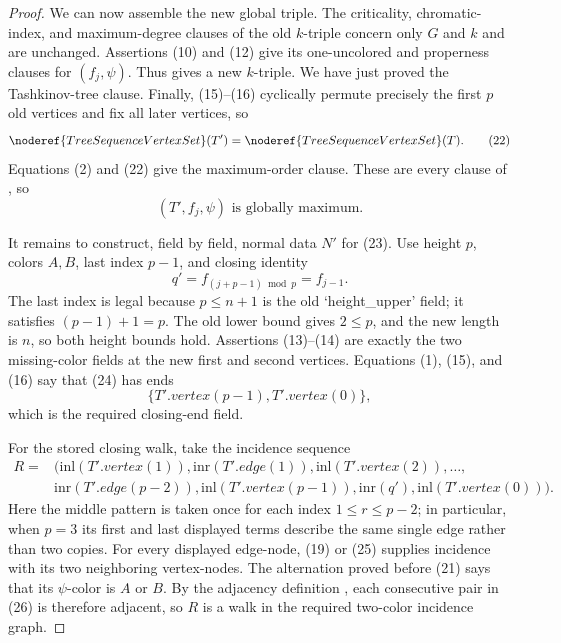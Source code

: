 \begin{proof}
We can now assemble the new global triple.  The criticality,
chromatic-index, and maximum-degree clauses of the old $k$-triple concern
only $G$ and $k$ and are unchanged.  Assertions (10) and (12) give its
one-uncolored and properness clauses for $(f_j,\psi)$.  Thus
 gives a new $k$-triple.  We have just proved the
Tashkinov-tree clause.  Finally, (15)--(16) cyclically permute precisely
the first $p$ old vertices and fix all later vertices, so
\[
        \noderef{TreeSequenceVertexSet}(T')
          =\noderef{TreeSequenceVertexSet}(T).                   \tag{22}
\]
Equations (2) and (22) give the maximum-order clause.  These are every
clause of , so
\[
                  (T',f_j,\psi)\text{ is globally maximum}.      \tag{23}
\]

It remains to construct, field by field, normal data $N'$ for (23).  Use
height $p$, colors $A,B$, last index $p-1$, and closing identity
\[
                  q'=f_{(j+p-1)\bmod p}=f_{j-1}.                 \tag{24}
\]
The last index is legal because $p\leq n+1$ is the old `height_upper'
field; it satisfies $(p-1)+1=p$.  The old lower bound gives $2\leq p$,
and the new length is $n$, so both height bounds hold.  Assertions
(13)--(14) are exactly the two missing-color fields at the new first and
second vertices.  Equations (1), (15), and (16) say that (24) has ends
\[
                    \{T'.vertex(p-1),T'.vertex(0)\},             \tag{25}
\]
which is the required closing-end field.

For the stored closing walk, take the incidence sequence
\[
 \begin{split}
 R={}&(\mathrm{inl}(T'.vertex(1)),
       \mathrm{inr}(T'.edge(1)),
       \mathrm{inl}(T'.vertex(2)),\ldots,\\
    &\mathrm{inr}(T'.edge(p-2)),
       \mathrm{inl}(T'.vertex(p-1)),
       \mathrm{inr}(q'),
       \mathrm{inl}(T'.vertex(0))).                              \tag{26}
 \end{split}
\]
Here the middle pattern is taken once for each index
$1\leq r\leq p-2$; in particular, when $p=3$ its first and last displayed
terms describe the same single edge rather than two copies.
For every displayed edge-node, (19) or (25) supplies incidence with its
two neighboring vertex-nodes.  The alternation proved before (21) says
that its $\psi$-color is $A$ or $B$.  By the adjacency definition
, each consecutive pair in (26) is
therefore adjacent, so $R$ is a walk in the required two-color incidence
graph.


\end{proof}
